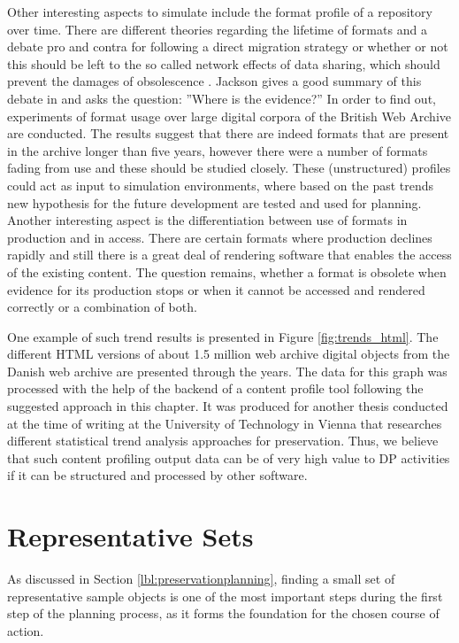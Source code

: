 Other interesting aspects to simulate include the format profile of a repository over time. There are different theories regarding the lifetime of formats and a debate pro and contra for following a direct migration strategy or whether or not this should be left to the so called network effects of data sharing, which should prevent the damages of obsolescence \cite{Rosenthal:1January2010:0737-8831:195}. Jackson gives a good summary of this debate in \cite{journals/corr/abs-1210-1714} and asks the question: ''Where is the evidence?'' In order to find out, experiments of format usage over large digital corpora of the British Web Archive are conducted. The results suggest that there are indeed formats that are present in the archive longer than five years, however there were a number of formats fading from use and these should be studied closely. These (unstructured) profiles could act as input to simulation environments, where based on the past trends new hypothesis for the future development are tested and used for planning. Another interesting aspect is the differentiation between use of formats in production and in access. There are certain formats where production declines rapidly and still there is a great deal of rendering software that enables the access of the existing content. The question remains, whether a format is obsolete when evidence for its production stops or when it cannot be accessed and rendered correctly or a combination of both.

One example of such trend results is presented in Figure \ref{fig:trends_html}. The different HTML versions of about 1.5 million web archive digital objects from the Danish web archive are presented through the years. The data for this graph was processed with the help of the backend of a content profile tool following the suggested approach in this chapter. It was produced for another thesis conducted at the time of writing at the University of Technology in Vienna that researches different statistical trend analysis approaches for preservation. Thus, we believe that such content profiling output data can be of very high value to DP activities if it can be structured and processed by other software.


\section{Representative Sets}
\label{sec:representative_sets}
As discussed in Section \ref{lbl:preservationplanning}, finding a small set of representative sample objects is one of the most important steps during the first step of the planning process, as it forms the foundation for the chosen course of action.


